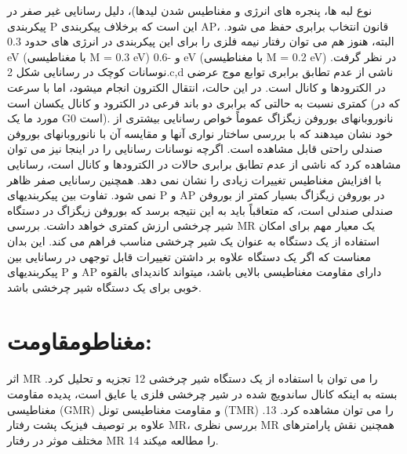نوع لبه ها، پنجره های انرژی و مغناطیس شدن لیدها)، دلیل رسانایی غیر صفر در پیکربندی P این است که برخلاف پیکربندی AP، قانون انتخاب برابری حفظ می شود. البته، هنوز هم می توان رفتار نیمه فلزی را برای این پیکربندی در انرژی های حدود 0.3 eV (با مغناطیسی M = 0.3 eV) و -0.6 eV (با مغناطیسی M = 0.2 eV) در نظر گرفت. نوسانات کوچک در رسانایی شکل 2.c,d ناشی از عدم تطابق برابری توابع موج عرضی در الکترودها و کانال است. در این حالت، انتقال الکترون انجام میشود، اما با سرعت کمتری نسبت به حالتی که برابری دو باند فرعی در الکترود و کانال یکسان است (که در مورد ما یک G0 است). نانوروبانهای بوروفن زیگزاگ عموماً خواص رسانایی بیشتری از خود نشان میدهند که با بررسی ساختار نواری آنها و مقایسه آن با نانوروبانهای بوروفن صندلی راحتی قابل مشاهده است. اگرچه نوسانات رسانایی را در اینجا نیز می توان مشاهده کرد که ناشی از عدم تطابق برابری حالات در الکترودها و کانال است، رسانایی با افزایش مغناطیس تغییرات زیادی را نشان نمی دهد. همچنین رسانایی صفر ظاهر نمی شود. تفاوت بین پیکربندیهای P و AP در بوروفن زیگزاگ بسیار کمتر از بوروفن صندلی صندلی است، که متعاقباً باید به این نتیجه برسد که بوروفن زیگزاگ در دستگاه شیر چرخشی ارزش کمتری خواهد داشت. بررسی MR یک معیار مهم برای امکان استفاده از یک دستگاه به عنوان یک شیر چرخشی مناسب فراهم می کند. این بدان معناست که اگر یک دستگاه علاوه بر داشتن تغییرات قابل توجهی در رسانایی بین پیکربندیهای P و AP دارای مقاومت مغناطیسی بالایی باشد، میتواند کاندیدای بالقوه خوبی برای یک دستگاه شیر چرخشی باشد.

\section{مغناطومقاومت:}
اثر MR را می توان با استفاده از یک دستگاه شیر چرخشی 12 تجزیه و تحلیل کرد. بسته به اینکه کانال ساندویچ شده در شیر چرخشی فلزی یا عایق است، پدیده مقاومت مغناطیسی (GMR) و مقاومت مغناطیسی تونل (TMR) را می توان مشاهده کرد. 13. علاوه بر توصیف فیزیک پشت رفتار MR، بررسی نظری MR همچنین نقش پارامترهای مختلف موثر در رفتار MR 14 را مطالعه میکند.

